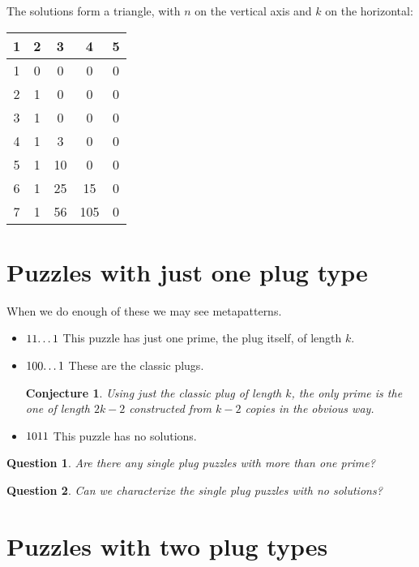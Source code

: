\documentclass[10pt]{article}
\newtheorem{conjecture}[theorem]{Conjecture}
\newtheorem{question}{Question}
\numberwithin{equation}{section}
\newenvironment{anote}
               {{\textcolor{blue}{Note:}}
                 \itshape
               }
               {}
\newcommand{\plug}[1]{%
\mbox{{\textbf\texttt #1}}
}
\begin{document}
The solutions form a triangle, with $n$ on the vertical axis and $k$ on the horizontal:

\begin{center}
\begin{tabular}{ |c|c|c|c|c| } 
 \hline
 1 & 2 & 3  & 4 & 5\\ 
 \hline
1 & 0 & 0  & 0 & 0\\ 
2 & 1 & 0  & 0 & 0\\ 
3 & 1 & 0  & 0 & 0\\ 
4 & 1 & 3  & 0 & 0\\ 
5 & 1 & 10  & 0 & 0\\ 
6 & 1 & 25  & 15 & 0\\ 
7 & 1 & 56  & 105 & 0\\ 

 \hline
\end{tabular}
\end{center}


\section{Puzzles with just one plug type}

\begin{anote}
When we do enough of these we may see metapatterns.
\end{anote}
\begin{itemize}
    \item $\plug{11\ldots 1}$
    This puzzle has just one prime, the plug itself, of length $k$. 
    \item $\plug{100\ldots 1}$ These are the classic plugs. 
    \begin{conjecture}
    Using just the classic plug of length $k$, the only prime is the  one of length $2k-2$ constructed from $k-2$ copies in the obvious way.
    \end{conjecture}
    
    \item $\plug{1011}$
    This puzzle has no solutions.
    

        \end{itemize}
\begin{question}
Are there any single plug puzzles with more than one prime?
\end{question}

\begin{question}
Can we characterize the single plug puzzles with no solutions?
\end{question}
\section{Puzzles with two plug types}
\end{document}
